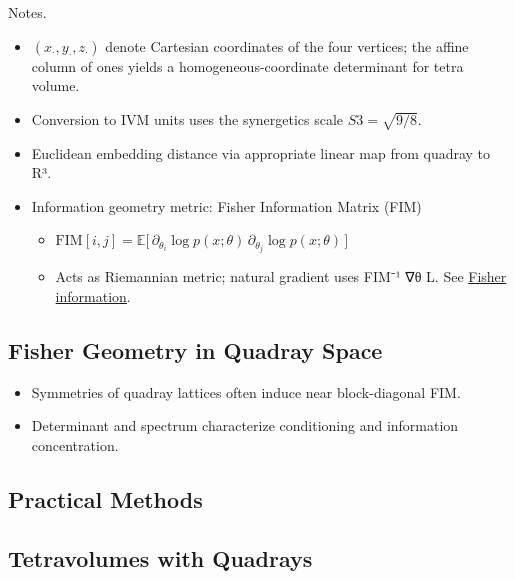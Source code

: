 \documentclass[
  10pt,
]{article}
\providecommand{\tightlist}{%
  \setlength{\itemsep}{0pt}\setlength{\parskip}{0pt}}
\begin{document}
Notes.

\begin{itemize}
\item
  \((x_\cdot,y_\cdot,z_\cdot)\) denote Cartesian coordinates of the four
  vertices; the affine column of ones yields a homogeneous-coordinate
  determinant for tetra volume.
\item
  Conversion to IVM units uses the synergetics scale \(S3=\sqrt{9/8}\).
\item
  Euclidean embedding distance via appropriate linear map from quadray
  to R³.
\item
  Information geometry metric: Fisher Information Matrix (FIM)

  \begin{itemize}
  \tightlist
  \item
    \(\mathrm{FIM}[i,j] = \mathbb{E}\big[\, \partial_{\theta_i} \log p(x;\theta)\,\partial_{\theta_j} \log p(x;\theta)\,\big]\)
  \item
    Acts as Riemannian metric; natural gradient uses FIM⁻¹ ∇θ L. See
    \href{https://en.wikipedia.org/wiki/Fisher_information}{Fisher
    information}.
  \end{itemize}
\end{itemize}

\hypertarget{fisher-geometry-in-quadray-space}{%
\subsection{Fisher Geometry in Quadray
Space}\label{fisher-geometry-in-quadray-space}}

\begin{itemize}
\tightlist
\item
  Symmetries of quadray lattices often induce near block-diagonal FIM.
\item
  Determinant and spectrum characterize conditioning and information
  concentration.
\end{itemize}

\hypertarget{practical-methods}{%
\subsection{Practical Methods}\label{practical-methods}}

\hypertarget{sec:tetravolumes_quadrays}{%
\subsection{Tetravolumes with
Quadrays}\label{sec:tetravolumes_quadrays}}
\end{document}
